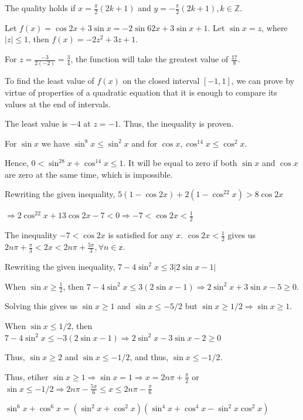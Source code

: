   The quality holds if $x = \frac{\pi}{2}(2k + 1)$ and $y = -\frac{\pi}{2}(2k + 1), k\in\mathbb{Z}$.
\item Let $f(x) = \cos2x + 3\sin x = -2\sin62x + 3\sin x + 1$. Let $\sin x = z$, where $|z|\leq 1$, then
  $f(x) = -2z^2 + 3z + 1$.

  For $z = \frac{-3}{2(-2)} = \frac{3}{4}$, the function will take the greatest value of $\frac{17}{8}$.

  To find the least value of $f(x)$ on the closed interval $\left[-1, 1\right]$, we can prove by virtue of
  properties of a quadratic equation that it is enough to compare its values at the end of intervals.

  The least value is $-4$ at $z = -1$. Thus, the inequality is proven.
\item For $\sin x$ we have $\sin^8x\leq \sin^2x$ and for $\cos x, \cos^{14}x\leq \cos^2 x$.

  Hence, $0 < \sin^28x + \cos^{14}x\leq 1$. It will be equal to zero if both $\sin x$ and $\cos x$ are zero
  at the same time, which is impossible.
\item Rewriting the given inequality, $5(1 - \cos2x) + 2(1 - \cos^22x) > 8\cos2x$

  $\Rightarrow 2\cos^22x + 13\cos2x - 7 < 0\Rightarrow -7 < \cos2x < \frac{1}{2}$

  The inequality $-7 < \cos2x$ is satisfied for any $x$. $\cos2x < \frac{1}{2}$ gives us $2n\pi +
  \frac{\pi}{3} < 2x < 2n\pi + \frac{5\pi}{3}, \forall n\in\mathbb{z}$.
\item Rewriting the given inequality, $7 - 4\sin^2x \leq 3|2\sin x - 1|$

  When $\sin x \geq \frac{1}{2}$, then $7 - 4\sin^2x\leq 3(2\sin x - 1)\Rightarrow 2\sin^2x + 3\sin x - 5
  \geq 0$.

  Solving this gives us $\sin x\geq 1$ and $\sin x\leq -5/2$ but $\sin x\geq 1/2\Rightarrow \sin x\geq 1$.

  When $\sin x\leq 1/2$, then $7 - 4\sin^2x \leq -3(2\sin x - 1)\Rightarrow 2\sin^2x - 3\sin x - 2\geq 0$

  Thus, $\sin x\geq 2$ and $\sin x\leq -1/2$, and thus, $\sin x\leq -1/2$.

  Thus, etiher $\sin x\geq 1\Rightarrow \sin x = 1 \Rightarrow x = 2n\pi + \frac{\pi}{2}$ or $\sin x\leq
  -1/2\Rightarrow 2n\pi - \frac{5\pi}{6}\leq x\leq 2n\pi - \frac{\pi}{6}$
\item $\sin^6x + \cos^6x = \left(\sin^2x + \cos^2x\right)\left(\sin^4x + \cos^4x - \sin^2x\cos^2x\right)$

